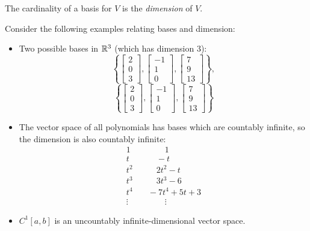 \begin{definition}[Dimension]
\label{def:dimension}
The cardinality of a basis for $V$ is the \textit{dimension} of $V$.
\end{definition}

\begin{example}
Consider the following examples relating bases and dimension:
\begin{itemize}
    \item Two possible bases in $\mathbb R^3$ (which has dimension 3):
    $$
    \left\{ 
    \begin{bmatrix} 2 \\ 0 \\ 3 \end{bmatrix}, 
    \begin{bmatrix} -1 \\ 1 \\ 0 \end{bmatrix}, 
    \begin{bmatrix} 7 \\ 9 \\ 13 \end{bmatrix}
    \right\},
    $$
    $$
    \left\{ 
    \begin{bmatrix} 2 \\ 0 \\ 3 \end{bmatrix},
    \begin{bmatrix} -1 \\ 1 \\ 0 \end{bmatrix},
    \begin{bmatrix} 7 \\ 9 \\ 13 \end{bmatrix}
    \right\}
    $$
    \item The vector space of all polynomials has bases which are countably infinite, so the dimension is also countably infinite:
    \begin{align*}
        1 & \quad\quad\quad 1 \\
        t & \quad\quad -t \\
        t^2 & \quad\quad 2t^2 - t \\
        t^3 & \quad\quad 3t^3 - 6 \\
        t^4 & \quad -7t^4 + 5t + 3 \\
        \vdots & \quad\quad\quad \vdots
    \end{align*}
    \item $C^1[a,b]$ is an uncountably infinite-dimensional vector space.
\end{itemize}
\end{example}

